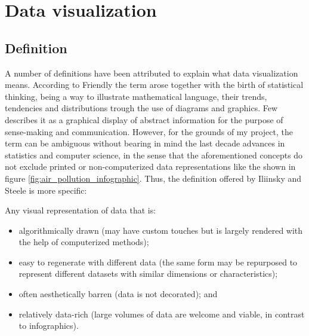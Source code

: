 \section{Data visualization}

\subsection{Definition}
A number of definitions have been attributed to explain what data visualization means. According to Friendly \cite{Friendly2009} the term arose together with the birth of statistical thinking, being a way to illustrate mathematical language, their trends, tendencies and distributions trough the use of diagrams and graphics. Few \cite{StephenFew2013} describes it as a graphical display of abstract information for the purpose of sense-making and communication. However, for the grounds of my project, the term can be  ambiguous without bearing in mind the last decade advances in statistics and computer science, in the sense that the aforementioned concepts do not exclude printed or non-computerized data representations like the shown in figure \ref{fig:air_pollution_infographic}. Thus, the definition offered by Iliinsky and Steele \cite{Iliinsky2011} is more specific: 
\begin{displayquote}
Any visual representation of data that is:
	\begin{itemize}
	\item algorithmically drawn (may have custom touches but is largely rendered with the help of computerized methods);
	\item easy to regenerate with different data (the same form may be repurposed to represent different datasets with similar dimensions or characteristics);
	\item often aesthetically barren (data is not decorated); and
	\item relatively data-rich (large volumes of data are welcome and viable, in contrast to infographics).
    \end{itemize}
\end{displayquote}

